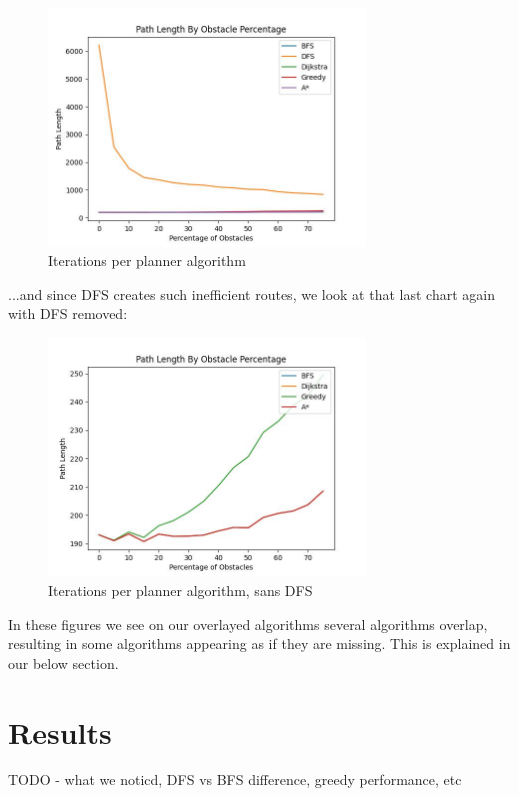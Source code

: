 \documentclass{article}
\begin{document}
\begin{figure}[H]
    \centering
    \includegraphics[width = 0.75\textwidth]{plots/path_length.jpg}
    \caption{Iterations per planner algorithm}
    \label{fig:paths-all}
\end{figure}

...and since DFS creates such inefficient routes, we look at that last chart again with DFS removed:

\begin{figure}[H]
    \centering
    \includegraphics[width = 0.75\textwidth]{plots/path_length_sans_dfs.jpg}
    \caption{Iterations per planner algorithm, sans DFS}
    \label{fig:paths-sans-dfs}
\end{figure}

In these figures we see on our overlayed algorithms several algorithms overlap, resulting in some algorithms appearing as if they are missing. This is explained in our below section.

\section*{Results}

TODO - what we noticd, DFS vs BFS difference, greedy performance, etc
\end{document}
